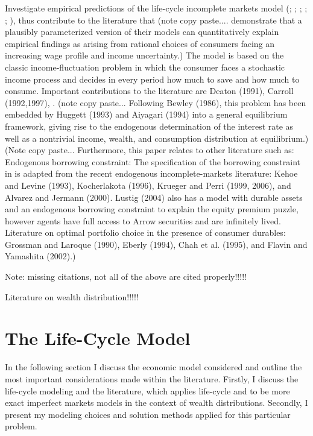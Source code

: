 \documentclass[a4paper,12pt]{article}
\begin{document}
Investigate empirical predictions of the life-cycle incomplete markets model (\cite{Gourinchas&Parker2002}; \cite{cagetti2003}; \cite{castaneda2003}; \cite{yang2009}; \cite{kaplan2010}; \cite{hintermaier2011}), thus contribute to the literature that (note copy paste.... demonstrate that a plausibly parameterized version of their models can quantitatively explain empirical findings as arising from rational choices of consumers facing an increasing wage profile and income uncertainty.)
The model is based on the classic income-fluctuation problem in which the consumer faces a stochastic income process and decides in every period how much to save and how much to consume. Important contributions to the literature are Deaton (1991), Carroll (1992,1997), \cite{Gourinchas&Parker2002}. (note copy paste... Following Bewley (1986), this problem has been embedded by Huggett (1993) and Aiyagari (1994) into a general equilibrium framework, giving rise to the endogenous determination of the interest rate as well as a nontrivial income, wealth, and consumption distribution at equilibrium.)
(Note copy paste... Furthermore, this paper relates to other literature such as: 
Endogenous borrowing constraint: The specification of the borrowing constraint  in \cite{FV&K2011} is adapted from the recent endogenous incomplete-markets literature: Kehoe and Levine (1993), Kocherlakota (1996), Krueger and Perri (1999, 2006), and Alvarez and Jermann (2000). Lustig (2004) also has a model with durable assets and an endogenous borrowing constraint to explain the equity premium puzzle, however agents have full access to Arrow securities and are infinitely lived.
Literature on optimal portfolio choice in the presence of consumer durables: Grossman and Laroque (1990), Eberly (1994), Chah et al. (1995), and Flavin and Yamashita (2002).)

Note: missing citations, not all of the above are cited properly!!!!!

Literature on wealth distribution!!!!! 

\section{The Life-Cycle Model}
\label{Chapter3}
In the following section I discuss the economic model considered and outline the most important considerations made within the literature. Firstly, I discuss the life-cycle modeling and the literature, which applies life-cycle and to be more exact imperfect markets models in the context of wealth distributions. Secondly, I present my modeling choices and solution methods applied for this particular problem. 
\end{document}
